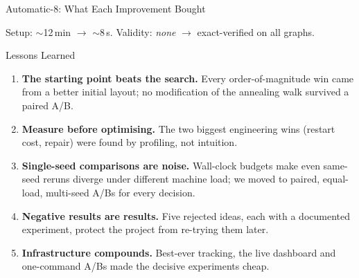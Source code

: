 \begin{frame}{Automatic-8: What Each Improvement Bought}
  \centering

  \smallskip
  Setup: $\sim$12\,min $\to$ $\sim$8\,s. Validity: \emph{none} $\to$ exact-verified on all graphs.
\end{frame}

\begin{frame}{Lessons Learned}
  \begin{enumerate}
    \item \textbf{The starting point beats the search.} Every order-of-magnitude win came
          from a better initial layout; no modification of the annealing walk survived a
          paired A/B.
    \item \textbf{Measure before optimising.} The two biggest engineering wins
          (restart cost, repair) were found by profiling, not intuition.
    \item \textbf{Single-seed comparisons are noise.} Wall-clock budgets make even
          same-seed reruns diverge under different machine load; we moved to paired,
          equal-load, multi-seed A/Bs for every decision.
    \item \textbf{Negative results are results.} Five rejected ideas, each with a
          documented experiment, protect the project from re-trying them later.
    \item \textbf{Infrastructure compounds.} Best-ever tracking, the live dashboard and
          one-command A/Bs made the decisive experiments cheap.
  \end{enumerate}
\end{frame}


